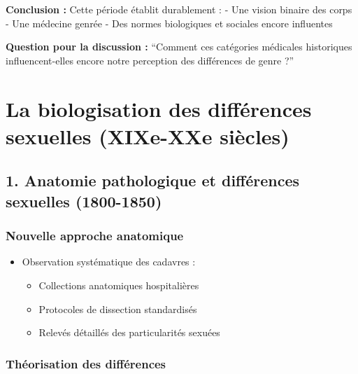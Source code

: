 \documentclass[
  letterpaper,
  DIV=11,
  numbers=noendperiod]{scrreprt}
\providecommand{\tightlist}{%
  \setlength{\itemsep}{0pt}\setlength{\parskip}{0pt}}\usepackage{longtable,booktabs,array}
\begin{document}
\textbf{Conclusion :} Cette période établit durablement : - Une vision
binaire des corps - Une médecine genrée - Des normes biologiques et
sociales encore influentes

\textbf{Question pour la discussion :} ``Comment ces catégories
médicales historiques influencent-elles encore notre perception des
différences de genre ?''


\chapter{La biologisation des différences sexuelles (XIXe-XXe
siècles)}\label{la-biologisation-des-diffuxe9rences-sexuelles-xixe-xxe-siuxe8cles}

\section{1. Anatomie pathologique et différences sexuelles
(1800-1850)}\label{anatomie-pathologique-et-diffuxe9rences-sexuelles-1800-1850}

\subsection{Nouvelle approche
anatomique}\label{nouvelle-approche-anatomique}

\begin{itemize}
\tightlist
\item
  Observation systématique des cadavres :

  \begin{itemize}
  \tightlist
  \item
    Collections anatomiques hospitalières
  \item
    Protocoles de dissection standardisés
  \item
    Relevés détaillés des particularités sexuées
  \end{itemize}
\end{itemize}

\subsection{Théorisation des
différences}\label{thuxe9orisation-des-diffuxe9rences}
\end{document}
